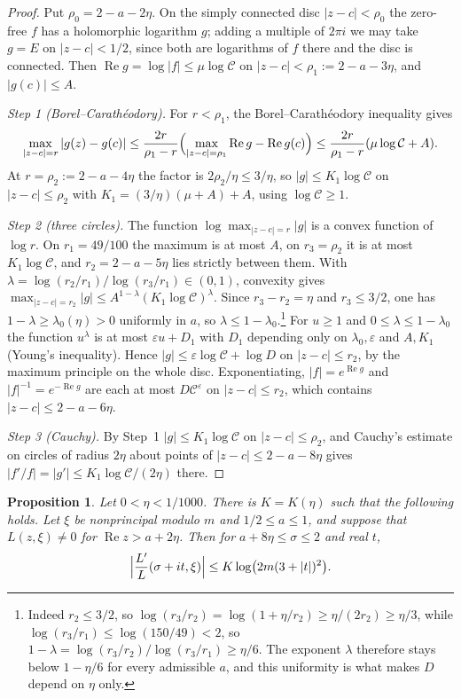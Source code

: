 \documentclass[11pt]{amsart}
\newtheorem{proposition}[theorem]{Proposition}
\theoremstyle{definition}
\theoremstyle{remark}
\numberwithin{equation}{section}
\newcommand{\R}{\operatorname{Re}}
\newcommand{\e}{e}
\begin{document}
\begin{proof}
Put $\rho_0=2-a-2\eta$. On the simply connected disc $|z-c|<\rho_0$ the
zero-free $f$ has a holomorphic logarithm $g$; adding a multiple of $2\pi i$
we may take $g=E$ on $|z-c|<1/2$, since both are logarithms of $f$ there and
the disc is connected. Then $\R g=\log|f|\le\mu\log\mathcal C$ on
$|z-c|<\rho_1:=2-a-3\eta$, and $|g(c)|\le A$.

\emph{Step 1 (Borel--Carath\'eodory).} For $r<\rho_1$, the
Borel--Carath\'eodory inequality gives
\[
\max_{|z-c|=r}|g(z)-g(c)|\le\frac{2r}{\rho_1-r}\Bigl(\max_{|z-c|=\rho_1}\R g-\R g(c)\Bigr)\le\frac{2r}{\rho_1-r}(\mu\log\mathcal C+A).
\]
At $r=\rho_2:=2-a-4\eta$ the factor is $2\rho_2/\eta\le3/\eta$, so
$|g|\le K_1\log\mathcal C$ on $|z-c|\le\rho_2$ with $K_1=(3/\eta)(\mu+A)+A$,
using $\log\mathcal C\ge1$.

\emph{Step 2 (three circles).} The function $\log\max_{|z-c|=r}|g|$ is a
convex function of $\log r$. On $r_1=49/100$ the maximum is at most $A$, on
$r_3=\rho_2$ it is at most $K_1\log\mathcal C$, and $r_2=2-a-5\eta$ lies
strictly between them. With
$\lambda=\log(r_2/r_1)/\log(r_3/r_1)\in(0,1)$, convexity gives
$\max_{|z-c|=r_2}|g|\le A^{1-\lambda}(K_1\log\mathcal C)^{\lambda}$. Since
$r_3-r_2=\eta$ and $r_3\le3/2$, one has $1-\lambda\ge\lambda_0(\eta)>0$
uniformly in $a$, so $\lambda\le1-\lambda_0$.\footnote{Indeed
$r_2\le3/2$, so $\log(r_3/r_2)=\log(1+\eta/r_2)\ge\eta/(2r_2)\ge\eta/3$, while
$\log(r_3/r_1)\le\log(150/49)<2$, so
$1-\lambda=\log(r_3/r_2)/\log(r_3/r_1)\ge\eta/6$. The exponent $\lambda$
therefore stays below $1-\eta/6$ for every admissible $a$, and this uniformity
is what makes $D$ depend on $\eta$ only.} For $u\ge1$ and $0\le\lambda\le1-\lambda_0$
the function $u^\lambda$ is at most $\varepsilon u+D_1$ with $D_1$ depending
only on $\lambda_0,\varepsilon$ and $A,K_1$ (Young's inequality). Hence
$|g|\le\varepsilon\log\mathcal C+\log D$ on $|z-c|\le r_2$, by the maximum
principle on the whole disc. Exponentiating, $|f|=\e^{\R g}$ and $|f|^{-1}=\e^{-\R g}$
are each at most $D\mathcal C^\varepsilon$ on $|z-c|\le r_2$, which contains
$|z-c|\le2-a-6\eta$.

\emph{Step 3 (Cauchy).} By Step~1 $|g|\le K_1\log\mathcal C$ on $|z-c|\le\rho_2$,
and Cauchy's estimate on circles of radius $2\eta$ about points of
$|z-c|\le2-a-8\eta$ gives $|f'/f|=|g'|\le K_1\log\mathcal C/(2\eta)$ there.
\end{proof}

\begin{proposition}\label{prop:logderiv}
Let $0<\eta<1/1000$. There is $K=K(\eta)$ such that the following holds. Let $\xi$
be nonprincipal modulo $m$ and $1/2\le a\le1$, and suppose that $L(z,\xi)\ne0$ for
$\R z>a+2\eta$. Then for $a+8\eta\le\sigma\le2$ and real $t$,
\[
\Bigl|\frac{L'}L(\sigma+it,\xi)\Bigr|\le K\log\bigl(2m(3+|t|)^2\bigr).
\]
\end{proposition}
\end{document}
